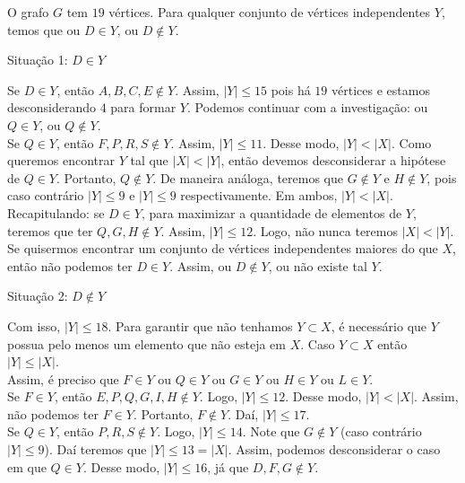 \documentclass[12pt, a4paper]{article}
\begin{document}
O grafo \(G\) tem \(19\) vértices. Para qualquer conjunto de vértices independentes \(Y\), temos que ou \(D \in Y\), ou \(D \notin Y\). \\

\begin{center}
Situação 1: \(D \in Y\)
\end{center}

Se \(D \in Y\), então \(A, B, C, E \notin Y\). Assim, \(|Y| \leq 15\) pois há \(19\) vértices e estamos desconsiderando \(4\) para formar \(Y\). Podemos continuar com a investigação: ou \(Q \in Y\), ou \(Q \notin Y\). \\

Se \(Q \in Y\), então \(F, P, R, S \notin Y\). Assim, \(|Y| \leq 11\). Desse modo, \(|Y| < |X|\). Como queremos encontrar \(Y\) tal que \(|X| < |Y|\), então devemos desconsiderar a hipótese de \(Q \in Y\). Portanto, \(Q \notin Y\). De maneira análoga, teremos que \(G \notin Y\) e \(H \notin Y\), pois caso contrário \(|Y| \leq 9\) e \(|Y| \leq 9\) respectivamente. Em ambos, \(|Y| < |X|\). \\  

Recapitulando: se \(D \in Y\), para maximizar a quantidade de elementos de \(Y\), teremos que ter \(Q, G, H \notin Y\). Assim, \(|Y| \leq 12\). Logo, não nunca teremos \(|X| < |Y|\). Se quisermos encontrar um conjunto de vértices independentes maiores do que \(X\), então não podemos ter \(D \in Y\). Assim, ou \( D \notin Y\), ou não existe tal \(Y\). 

\begin{center}
Situação 2: \(D \notin Y\)
\end{center}

Com isso, \(|Y| \leq 18\). Para garantir que não tenhamos \(Y \subset X\), é necessário que \(Y\) possua pelo menos um elemento que não esteja em \(X\). Caso \(Y \subset X\) então \(|Y| \leq |X|\). \\

Assim,  é preciso que \(F \in Y\) ou \(Q \in Y\) ou \(G \in Y\) ou \(H \in Y\) ou \(L \in Y\).  \\

Se \(F \in Y\), então \(E, P, Q, G, I, H \notin Y\). Logo, \(|Y| \leq 12\). Desse modo, \(|Y| <|X|\). Assim, não podemos ter \(F \in Y\). Portanto, \(F \notin Y\). Daí, \(|Y| \leq 17\).\\

Se \(Q \in Y\), então \(P, R, S \notin Y\). Logo, \(|Y| \leq 14\). Note que \(G \notin Y\) (caso contrário \(|Y| \leq 9\)). Daí teremos que \(|Y| \leq 13 = |X|\). Assim, podemos desconsiderar o caso em que \(Q \in Y\). Desse modo, \(|Y| \leq 16\), já que \(D, F, G \notin Y\). \\
\end{document}
